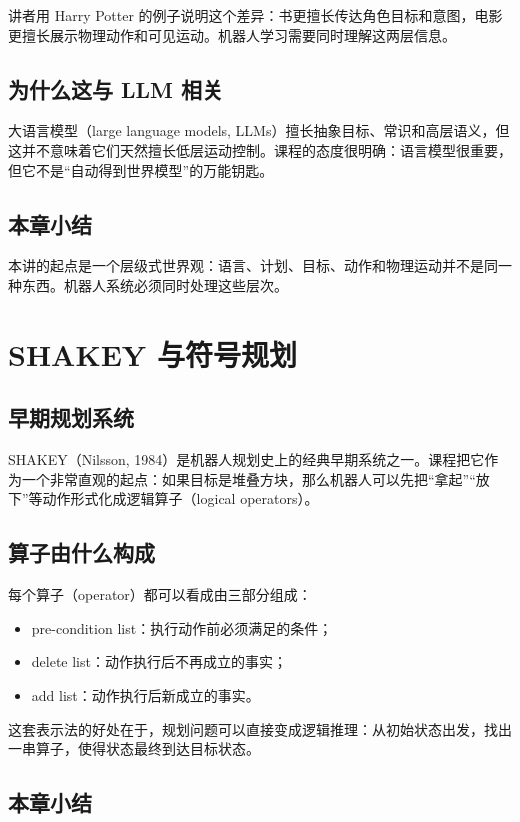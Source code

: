\documentclass[a4paper]{article}
\begin{document}
讲者用 Harry Potter 的例子说明这个差异：书更擅长传达角色目标和意图，电影更擅长展示物理动作和可见运动。机器人学习需要同时理解这两层信息。

\subsection{为什么这与 LLM 相关}

大语言模型（large language models, LLMs）擅长抽象目标、常识和高层语义，但这并不意味着它们天然擅长低层运动控制。课程的态度很明确：语言模型很重要，但它不是“自动得到世界模型”的万能钥匙。

\subsection{本章小结}

本讲的起点是一个层级式世界观：语言、计划、目标、动作和物理运动并不是同一种东西。机器人系统必须同时处理这些层次。

\section{SHAKEY 与符号规划}

\subsection{早期规划系统}

SHAKEY（Nilsson, 1984）是机器人规划史上的经典早期系统之一。课程把它作为一个非常直观的起点：如果目标是堆叠方块，那么机器人可以先把“拿起”“放下”等动作形式化成逻辑算子（logical operators）。

\subsection{算子由什么构成}

每个算子（operator）都可以看成由三部分组成：
\begin{itemize}
  \item pre-condition list：执行动作前必须满足的条件；
  \item delete list：动作执行后不再成立的事实；
  \item add list：动作执行后新成立的事实。
\end{itemize}

这套表示法的好处在于，规划问题可以直接变成逻辑推理：从初始状态出发，找出一串算子，使得状态最终到达目标状态。

\subsection{本章小结}
\end{document}
